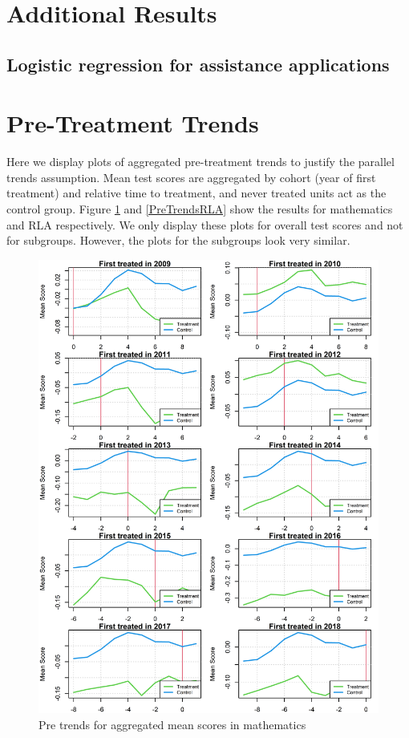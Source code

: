 
\section{Additional Results} \label{AppendixA}

\subsection{Logistic regression for assistance applications}




\section{Pre-Treatment Trends} \label{PreTrends}

Here we display plots of aggregated pre-treatment trends to justify the parallel trends assumption. Mean test scores are aggregated by cohort (year of first treatment) and relative time to treatment, and never treated units act as the control group. Figure \ref{PreTrendsMath} and \ref{PreTrendsRLA} show the results for mathematics and RLA respectively. We only display these plots for overall test scores and not for subgroups. However, the plots for the subgroups look very similar.


\begin{figure}[!h]
	\centering
	\includegraphics[scale=1]{"../Code & Data/ParTrendsPlotMathematics.png"}
	\caption{Pre trends for aggregated mean scores in mathematics}
	\label{PreTrendsMath}
\end{figure}

